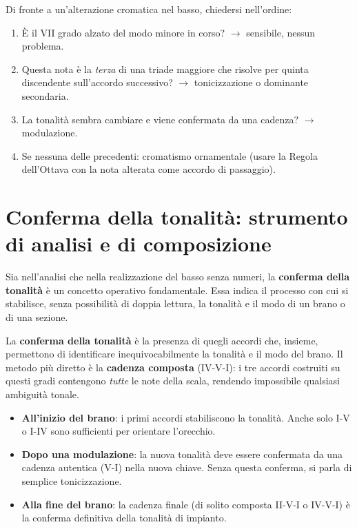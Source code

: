 \begin{regola}
	\label{reg:interpretazione_alterazione}
	Di fronte a un'alterazione cromatica nel basso, chiedersi nell'ordine:
	\begin{enumerate}
		\item È il VII grado alzato del modo minore in corso? $\rightarrow$ sensibile, nessun problema.
		\item Questa nota è la \textit{terza} di una triade maggiore che risolve per quinta discendente sull'accordo successivo? $\rightarrow$ tonicizzazione o dominante secondaria.
		\item La tonalità sembra cambiare e viene confermata da una cadenza? $\rightarrow$ modulazione.
		\item Se nessuna delle precedenti: cromatismo ornamentale (usare la Regola dell'Ottava con la nota alterata come accordo di passaggio).
	\end{enumerate}
\end{regola}

\section{Conferma della tonalità: strumento di analisi e di composizione}
\label{sec:conferma_tonalita}

Sia nell'analisi che nella realizzazione del basso senza numeri, la \textbf{conferma della tonalità} è un concetto operativo fondamentale. Essa indica il processo con cui si stabilisce, senza possibilità di doppia lettura, la tonalità e il modo di un brano o di una sezione.

\begin{definizione}
	\label{def:conferma_tonalita}
	La \textbf{conferma della tonalità} è la presenza di quegli accordi che, insieme, permettono di identificare inequivocabilmente la tonalità e il modo del brano. Il metodo più diretto è la \textbf{cadenza composta} (IV-V-I): i tre accordi costruiti su questi gradi contengono \textit{tutte} le note della scala, rendendo impossibile qualsiasi ambiguità tonale.
\end{definizione}

\begin{regola}
	\label{reg:quando_conferma_tonalita}
	\begin{itemize}
		\item \textbf{All'inizio del brano}: i primi accordi stabiliscono la tonalità. Anche solo I-V o I-IV sono sufficienti per orientare l'orecchio.
		\item \textbf{Dopo una modulazione}: la nuova tonalità deve essere confermata da una cadenza autentica (V-I) nella nuova chiave. Senza questa conferma, si parla di semplice tonicizzazione.
		\item \textbf{Alla fine del brano}: la cadenza finale (di solito composta II-V-I o IV-V-I) è la conferma definitiva della tonalità di impianto.
	\end{itemize}
\end{regola}

